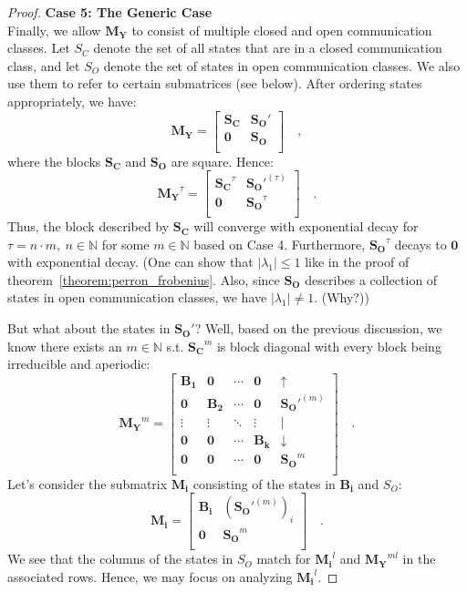 \documentclass[../../main.tex]{subfiles}
\begin{document}
\begin{proof}
        \textbf{Case 5: The Generic Case} \\
        Finally, we allow $\bm{M_Y}$ to consist of multiple closed and open communication classes. Let $S_C$ denote the set of all states that are in a closed communication class, and let $S_O$ denote the set of states in open communication classes. We also use them to refer to certain submatrices (see below). After ordering states appropriately, we have:
        \[
            \bm{M_Y} = 
            \begin{bmatrix}
            \bm{S_C} & \bm{S_O}' \\
            \bm{0} & \bm{S_O} \\
            \end{bmatrix}
            \quad ,
        \]
        where the blocks $\bm{S_C}$ and $\bm{S_O}$ are square. Hence:
        \[
            \bm{M_Y}^\tau = 
            \begin{bmatrix}
            \bm{S_C}^\tau & \bm{S_O}'^{(\tau)} \\
            \bm{0} & \bm{S_O}^{\tau} \\
            \end{bmatrix}
            \quad .
        \]
        Thus, the block described by $\bm{S_C}$ will converge with exponential decay for $\tau = n \cdot m, \ n \in \mathbb{N}$ for some $m \in \mathbb{N}$ based on Case 4. Furthermore, $\bm{S_O}^{\tau}$ decays to $\bm{0}$ with exponential decay. (One can show that $|\lambda_1| \leq 1$ like in the proof of theorem~\ref{theorem:perron_frobenius}. Also, since $\bm{S_O}$ describes a collection of states in open communication classes, we have $|\lambda_1| \neq 1$. (Why?)) 

        But what about the states in $\bm{S_O}'$? Well, based on the previous discussion, we know there exists an $m \in \mathbb{N}$ s.t. $\bm{S_C}^m$ is block diagonal with every block being irreducible and aperiodic:
        \[
            \bm{M_Y}^m = 
            \begin{bmatrix}
            \bm{B_1} & \bm{0} & \cdots & \bm{0} & \uparrow \\
            \bm{0} & \bm{B_2} & \cdots & \bm{0} & \bm{S_O}'^{(m)} \\
            \vdots & \vdots & \ddots & \vdots & \mid \\
            \bm{0} & \bm{0} & \cdots & \bm{B_k} & \downarrow \\
            \bm{0} & \bm{0} & \cdots & \bm{0} & \bm{S_O}^{m} \\
            \end{bmatrix}
            \quad .
        \]
        Let's consider the submatrix $\bm{M_i}$ consisting of the states in $\bm{B_i}$ and $S_O$:
        \[
            \bm{M_i} = 
            \begin{bmatrix}
            \bm{B_i} & (\bm{S_O}'^{(m)})_i \\
            \bm{0} & \bm{S_O}^{m} \\
            \end{bmatrix}
            \quad .
        \]
        We see that the columns of the states in $S_O$ match for $\bm{M_i}^l$ and $\bm{M_Y}^{ml}$ in the associated rows. Hence, we may focus on analyzing $\bm{M_i}^l$.


\end{proof}
\end{document}
